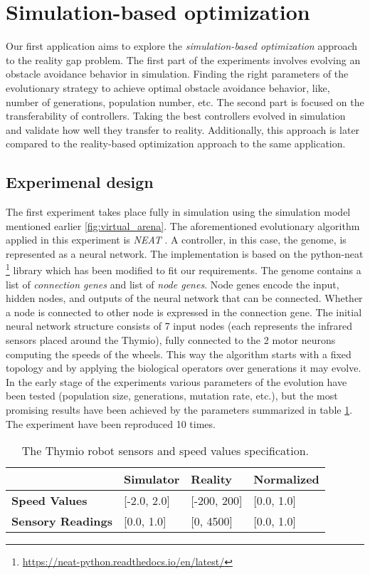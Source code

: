 \section{Simulation-based optimization}

Our first application aims to explore the \emph{simulation-based optimization} approach to the reality gap problem. The first part of the experiments involves evolving an obstacle avoidance behavior in simulation. Finding the right parameters of the evolutionary strategy to achieve optimal obstacle avoidance behavior, like, number of generations, population number, etc. The second part is focused on the transferability of controllers. Taking the best controllers evolved in simulation and validate how well they transfer to reality. Additionally, this approach is later compared to the reality-based optimization approach to the same application.

\subsection{Experimenal design}

The first experiment takes place fully in simulation using the simulation model mentioned earlier \ref{fig:virtual_arena}. The aforementioned evolutionary algorithm applied in this experiment is \emph{NEAT} \cite{stanley2002evolving}. A controller, in this case, the genome, is represented as a neural network. The implementation is based on the python-neat \footnote{\url{https://neat-python.readthedocs.io/en/latest/}} library which has been modified to fit our requirements. The genome contains a list of \emph{connection genes} and list of \emph{node genes}. Node genes encode the input, hidden nodes, and outputs of the neural network that can be connected. Whether a node is connected to other node is expressed in the connection gene. The initial neural network structure consists of 7 input nodes (each represents the infrared sensors placed around the Thymio), fully connected to the 2 motor neurons computing the speeds of the wheels. This way the algorithm starts with a fixed topology and by applying the biological operators over generations it may evolve. In the early stage of the experiments various parameters of the evolution have been tested (population size, generations, mutation rate, etc.), but the most promising results have been achieved by the parameters summarized in table \ref{neat_parameters}. The experiment have been reproduced 10 times.

\begin{table}[H]
\begin{tabular}{llll}
\centering
\hline
\textbf{}                            & \textbf{Simulator}   & \textbf{Reality}  & \textbf{Normalized}  \\ \hline
\textbf{Speed Values}                & {[}-2.0, 2.0{]}       & {[}-200, 200{]}      & {[}0.0, 1.0{]} \\
\textbf{Sensory Readings}            & {[}0.0, 1.0{]}        & {[}0, 4500{]}        & {[}0.0, 1.0{]} \\
\end{tabular}
\caption{The Thymio robot sensors and speed values specification.}
\label{neat_parameters}
\end{table}

